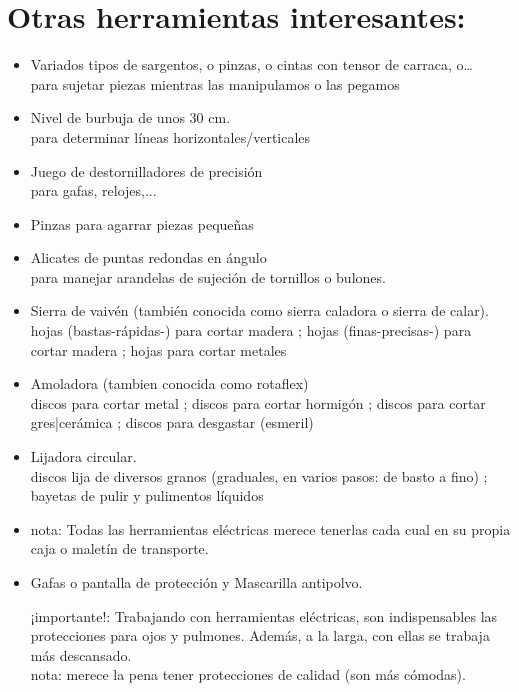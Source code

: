 \documentclass[spanish,10pt,a4paper,final,oneside]{article}
\begin{document}
\section*{Otras herramientas interesantes:}

\begin{itemize}

\item Variados tipos de sargentos, o pinzas, o cintas con tensor de carraca, o\ldots
\\para sujetar piezas mientras las manipulamos o las pegamos

\item Nivel de burbuja de unos 30 cm.
\\para determinar líneas horizontales/verticales

\item Juego de destornilladores de precisión
\\para gafas, relojes,...

\item Pinzas para agarrar piezas pequeñas

\item Alicates de puntas redondas en ángulo
\\para manejar arandelas de sujeción de tornillos o bulones.

\item Sierra de vaivén (también conocida como sierra caladora o sierra de calar).
\\ hojas (bastas-rápidas-) para cortar madera ; hojas (finas-precisas-) para cortar madera ; hojas para cortar metales

\item Amoladora (tambien conocida como rotaflex)
\\ discos para cortar metal ; discos para cortar hormigón ; discos para cortar gres|cerámica ; discos para desgastar (esmeril)

\item Lijadora circular.
\\ discos lija de diversos granos (graduales, en varios pasos: de basto a fino) ; bayetas de pulir y pulimentos líquidos

\item nota: Todas las herramientas eléctricas merece tenerlas cada cual en su propia caja o maletín de transporte.

\item Gafas o pantalla de protección y Mascarilla antipolvo.

¡importante!: Trabajando con herramientas eléctricas, son indispensables las protecciones para ojos y pulmones. Además, a la larga, con ellas se trabaja más descansado.
\\nota: merece la pena tener protecciones de calidad (son más cómodas).


\end{itemize}
\end{document}
